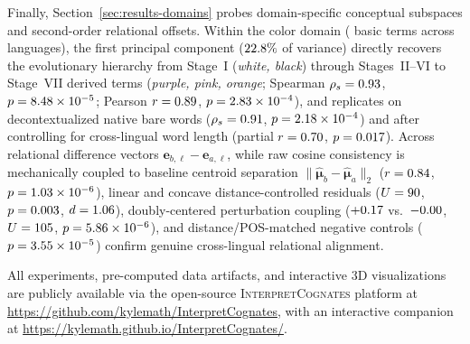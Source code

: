 Finally, Section~\ref{sec:results-domains} probes domain-specific conceptual subspaces and second-order relational offsets.
Within the color domain (\ColorNumColors{} basic terms across \ColorNumLanguages{} languages), the first principal component ($22.8{}\%$ of variance) directly recovers the \citet{berlin1969} evolutionary hierarchy from Stage~I (\emph{white, black}) through Stages~II--VI to Stage~VII derived terms (\emph{purple, pink, orange}; Spearman $\rho_s = 0.93{}$, $p = 8.48 \times 10^{-5}{}$; Pearson $r = 0.89{}$, $p = 2.83 \times 10^{-4}{}$), and replicates on decontextualized native bare words ($\rho_s = 0.91{}$, $p = 2.18 \times 10^{-4}{}$) and after controlling for cross-lingual word length (partial $r = 0.70{}$, $p = 0.017{}$).
Across relational difference vectors $\mathbf{e}_{b,\ell} - \mathbf{e}_{a,\ell}$, while raw cosine consistency is mechanically coupled to baseline centroid separation $\|\hat{\boldsymbol{\mu}}_b - \hat{\boldsymbol{\mu}}_a\|_2$ ($r = 0.84{}$, $p = 1.03 \times 10^{-6}{}$), linear and concave distance-controlled residuals ($U = 90{}$, $p = 0.003{}$, $d = 1.06{}$), doubly-centered perturbation coupling ($+0.17{}$ vs.\ $-0.00{}$, $U = 105{}$, $p = 5.86 \times 10^{-6}{}$), and distance/POS-matched negative controls ($p = 3.55 \times 10^{-5}{}$) confirm genuine cross-lingual relational alignment.

All experiments, pre-computed data artifacts, and interactive 3D visualizations are publicly available via the open-source \textsc{InterpretCognates} platform at \url{https://github.com/kylemath/InterpretCognates}, with an interactive companion at \url{https://kylemath.github.io/InterpretCognates/}.

